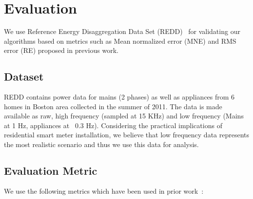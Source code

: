 \documentclass[conference]{IEEEtran}
\newcommand{\figref}[1]{Figure~\ref{#1}}
\begin{document}
\section{Evaluation}

\noindent We use Reference Energy Disaggregation Data Set (REDD)~\cite{redd} for validating our algorithms based on metrics such as Mean normalized error (MNE) and RMS error (RE) proposed in previous work.
\subsection{Dataset}
\noindent REDD contains power data for mains (2 phases) as well as appliances from 6 homes in Boston area collected in the summer of 2011. The data is made available as raw, high frequency (sampled at 15 KHz) and low frequency (Mains at 1 Hz, appliances at ~0.3 Hz). Considering the practical implications of residential smart meter installation, we believe that low frequency data represents the most realistic scenario and thus we use this data for analysis. 



%   
%
\subsection{Evaluation Metric}

\noindent We use the following metrics which have been used in prior work~\cite{parson2012_aaai,redd}:
\end{document}
